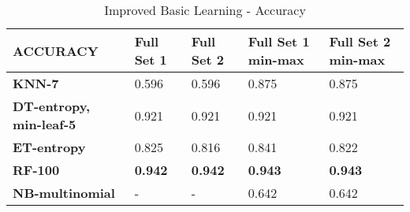 \documentclass[10pt, conference, compsocconf]{IEEEtran}
\begin{document}
\begin{center}
	\begin{table}[t]
		\centering \footnotesize
		\vspace{0.01cm}
		\caption{Improved Basic Learning - Accuracy}
		\hspace{1cm}
		\begin{tabularx}{\linewidth}{ l  X  X  X  X }
			\hline
			\textbf{ACCURACY} &	\textbf{Full Set 1}&	\textbf{Full Set 2}&	\textbf{Full Set 1 min-max}&	\textbf{Full Set 2 min-max} \\ \hline
			
			
			\textbf{KNN-7}&  0.596&	0.596&	0.875&	0.875 \\ \hline
			\textbf{DT-entropy, min-leaf-5}&  0.921&	0.921&	0.921&	0.921 \\ \hline
			\textbf{ET-entropy}&  0.825&	0.816&	0.841&	0.822 \\ \hline
			\textbf{RF-100}& \textbf{0.942}&	\textbf{0.942}&	\textbf{0.943}&	\textbf{0.943} \\ \hline
			\textbf{NB-multinomial}&  -	&-	&0.642&	0.642\\ \hline
			
			
		\end{tabularx}\newline
		\vspace{-0.05cm}
		\label{Table3}
	\end{table} \hfil
\end{center}
\end{document}
